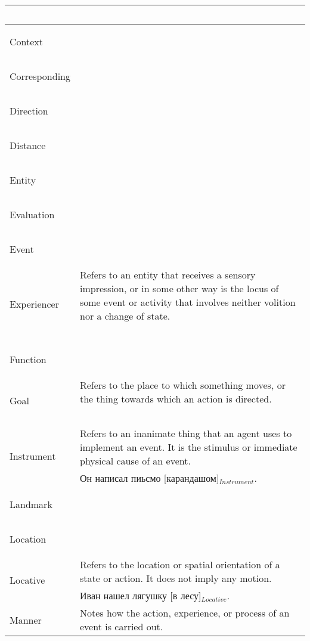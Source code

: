 \documentclass[a4paper,11pt, onecolumn,twoside]{article}
\begin{document}
\begin{longtable}{ p{}  p{} }
        & ~ \\
\midrule
 \multirow{2}{*}{Context} & ~ \\ 
        & ~ \\
\midrule
 \multirow{2}{*}{Corresponding} & ~ \\ 
        & ~ \\
\midrule
 \multirow{2}{*}{Direction} & ~ \\ 
        & ~ \\
\midrule
 \multirow{2}{*}{Distance} & ~ \\ 
        & ~ \\
\midrule
 \multirow{2}{*}{Entity} & ~ \\ 
        & ~ \\
\midrule
 \multirow{2}{*}{Evaluation} & ~ \\ 
        & ~ \\
\midrule
 \multirow{2}{*}{Event} & ~ \\ 
        & ~ \\
\midrule
 \multirow{2}{*}{Experiencer} & Refers to an entity that receives a sensory impression, or in some other way is the locus of some event or activity that involves neither volition nor a change of state. \\ 
        & ~ \\
\midrule
 \multirow{2}{*}{Function} & ~ \\ 
        & ~ \\
\midrule
 \multirow{2}{*}{Goal} & Refers to the place to which something moves, or the thing towards which an action is directed. \\ 
        & ~ \\
\midrule
 \multirow{2}{*}{Instrument} & Refers to an inanimate thing that an agent uses to implement an event. It is the stimulus or immediate physical cause of an event. \\ 
        & Он написал пиьсмо [карандашом]$_{Instrument}$. \\
\midrule
 \multirow{2}{*}{Landmark} & ~ \\ 
        & ~ \\
\midrule
 \multirow{2}{*}{Location} & ~ \\ 
        & ~ \\
\midrule
 \multirow{2}{*}{Locative} & Refers to the location or spatial orientation of a state or action. It does not imply any motion. \\ 
        & Иван нашел лягушку [в лесу]$_{Locative}$. \\
\midrule
 \multirow{2}{*}{Manner} & Notes how the action, experience, or process of an event is carried out. \\ 

\end{longtable}
\end{document}
